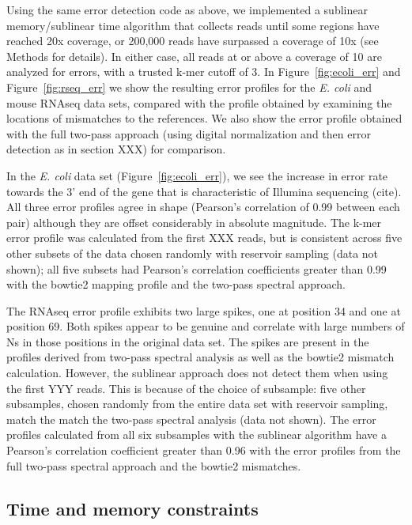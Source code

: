 \documentclass{article}
\begin{document}
Using the same error detection code as above, we implemented a
sublinear memory/sublinear time algorithm that collects reads until
some regions have reached 20x coverage, or 200,000 reads have
surpassed a coverage of 10x (see Methods for details).  In either
case, all reads at or above a coverage of 10 are analyzed for errors,
with a trusted k-mer cutoff of 3.  In Figure~\ref{fig:ecoli_err} and
Figure~\ref{fig:rseq_err} we show the resulting error profiles for the
{\em E. coli} and mouse RNAseq data sets, compared with the profile
obtained by examining the locations of mismatches to the references.
We also show the error profile obtained with the full two-pass approach
(using digital normalization and then error detection as in section XXX)
for comparison.

In the {\em E. coli} data set (Figure~\ref{fig:ecoli_err}), we see the
increase in error rate towards the 3' end of the gene that is
characteristic of Illumina sequencing (cite).  All three error
profiles agree in shape (Pearson's correlation of 0.99 between each
pair) although they are offset considerably in absolute magnitude.
The k-mer error profile was calculated from the first XXX reads, but
is consistent across five other subsets of the data chosen randomly
with reservoir sampling (data not shown); all five subsets had
Pearson's correlation coefficients greater than 0.99 with the
bowtie2 mapping profile and the two-pass spectral approach.

The RNAseq error profile exhibits two large spikes, one at position 34
and one at position 69.  Both spikes appear to be genuine and
correlate with large numbers of Ns in those positions in the original
data set.  The spikes are present in the profiles derived from
two-pass spectral analysis as well as the bowtie2 mismatch
calculation.  However, the sublinear approach does not detect them
when using the first YYY reads.  This is because of the choice of
subsample: five other subsamples, chosen randomly from the entire data
set with reservoir sampling, match the match the two-pass spectral
analysis (data not shown).  The error profiles calculated from all six
subsamples with the sublinear algorithm have a Pearson's correlation
coefficient greater than 0.96 with the error profiles from the full
two-pass spectral approach and the bowtie2 mismatches.


\subsection{Time and memory constraints}
\end{document}
